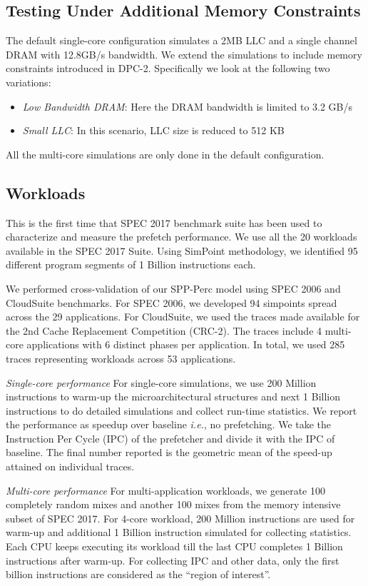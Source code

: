 \documentclass{sig-alternate}
\begin{document}
\subsection{Testing Under Additional Memory Constraints}
The default single-core configuration simulates a 2MB LLC and a single channel DRAM with 12.8GB/s bandwidth. 
We extend the simulations to include memory constraints introduced in DPC-2. 
Specifically we look at the following two variations:
\begin{itemize}
    \item \textit{Low Bandwidth DRAM}: Here the DRAM bandwidth is limited to 3.2 GB/s
    \item \textit{Small LLC}: In this scenario, LLC size is reduced to 512 KB
\end{itemize}
All the multi-core simulations are only done in the default configuration.

\subsection{Workloads}
This is the first time that SPEC 2017 benchmark suite\cite{SPEC2017} has been used to characterize and measure the prefetch performance. 
We use all the 20 workloads available in the SPEC 2017 Suite. 
Using SimPoint\cite{SimPoint} methodology, we identified 95 different program segments of 1 Billion instructions each.

We performed cross-validation of our SPP-Perc model using SPEC 2006\cite{SPEC2006} and CloudSuite\cite{CloudSuite} benchmarks.
For SPEC 2006, we developed 94 simpoints spread across the 29 applications.
For CloudSuite, we used the traces made available for the 2nd Cache Replacement Competition (CRC-2)\cite{CRC_2}.
The traces include 4 multi-core applications with 6 distinct phases per application. 
In total, we used 285 traces representing workloads across 53 applications. 

\textit{Single-core performance} For single-core simulations, we use 200 Million instructions to warm-up the microarchitectural structures and next 1 Billion instructions to do detailed simulations and collect run-time statistics. 
We report the performance as speedup over baseline \textit{i.e.}, no prefetching. 
We take the Instruction Per Cycle (IPC) of the prefetcher and divide it with the IPC of baseline. 
The final number reported is the geometric mean of the speed-up attained on individual traces.

\textit{Multi-core performance} For multi-application workloads, we generate 100 completely random mixes and another 100 mixes from the memory intensive subset of SPEC 2017.
For 4-core workload, 200 Million instructions are used for warm-up and additional 1 Billion instruction simulated for collecting statistics. 
Each CPU keeps executing its workload till the last CPU completes 1 Billion instructions after warm-up. 
For collecting IPC and other data, only the first billion instructions are considered as the ``region of interest''. 
\end{document}
